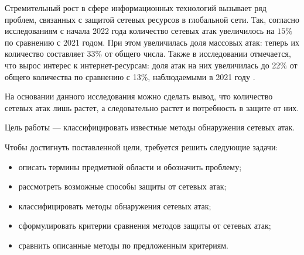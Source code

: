 \maketableofcontents

\intro



Стремительный рост в сфере информационных технологий вызывает ряд проблем, связанных с защитой сетевых ресурсов в глобальной сети.
Так, согласно исследованиям с начала 2022 года количество сетевых атак увеличилось на $15\%$ по сравнению с 2021 годом. При этом увеличилась доля массовых атак: теперь их количество составляет 33\% от общего числа. Также в исследовании отмечается, что вырос интерес к интернет-ресурсам: доля атак на них увеличилась до 22\% от общего количества по сравнению с 13\%, наблюдаемыми в 2021 году \cite{investigate}.

На основании данного исследования можно сделать вывод, что количество сетевых атак лишь растет, а следовательно растет и потребность в защите от них.


Цель работы --- классифицировать известные методы обнаружения сетевых атак.

Чтобы достигнуть поставленной цели, требуется решить следующие задачи:

\begin{itemize}
    \item описать термины предметной области и обозначить проблему;
    \item рассмотреть возможные способы защиты от сетевых атак;
	\item классифицировать методы обнаружения сетевых атак;
	\item сформулировать критерии сравнения методов защиты от сетевых атак;
	\item сравнить описанные методы по предложенным критериям.
\end{itemize}

